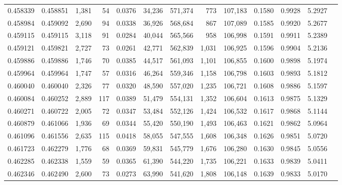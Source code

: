 \begin{tabular}{rrrrrrrrrrrrr}
0.458339 & 0.458851 & 1,381 &    54 &                                     0.0376 &  34,236 & 571,374 &     773 & 107,183 & 0.1580 & 0.9928 & 5.2927 \\
0.458984 & 0.459092 & 2,690 &    94 &                                     0.0338 &  36,926 & 568,684 &     867 & 107,089 & 0.1585 & 0.9920 & 5.2677 \\
0.459115 & 0.459115 & 3,118 &    91 &                                     0.0284 &  40,044 & 565,566 &     958 & 106,998 & 0.1591 & 0.9911 & 5.2389 \\
0.459121 & 0.459821 & 2,727 &    73 &                                     0.0261 &  42,771 & 562,839 &   1,031 & 106,925 & 0.1596 & 0.9904 & 5.2136 \\
0.459886 & 0.459886 & 1,746 &    70 &                                     0.0385 &  44,517 & 561,093 &   1,101 & 106,855 & 0.1600 & 0.9898 & 5.1974 \\
0.459964 & 0.459964 & 1,747 &    57 &                                     0.0316 &  46,264 & 559,346 &   1,158 & 106,798 & 0.1603 & 0.9893 & 5.1812 \\
0.460040 & 0.460040 & 2,326 &    77 &                                     0.0320 &  48,590 & 557,020 &   1,235 & 106,721 & 0.1608 & 0.9886 & 5.1597 \\
0.460084 & 0.460252 & 2,889 &   117 &                                     0.0389 &  51,479 & 554,131 &   1,352 & 106,604 & 0.1613 & 0.9875 & 5.1329 \\
0.460271 & 0.460722 & 2,005 &    72 &                                     0.0347 &  53,484 & 552,126 &   1,424 & 106,532 & 0.1617 & 0.9868 & 5.1144 \\
0.460879 & 0.461066 & 1,936 &    69 &                                     0.0344 &  55,420 & 550,190 &   1,493 & 106,463 & 0.1621 & 0.9862 & 5.0964 \\
0.461096 & 0.461556 & 2,635 &   115 &                                     0.0418 &  58,055 & 547,555 &   1,608 & 106,348 & 0.1626 & 0.9851 & 5.0720 \\
0.461723 & 0.462279 & 1,776 &    68 &                                     0.0369 &  59,831 & 545,779 &   1,676 & 106,280 & 0.1630 & 0.9845 & 5.0556 \\
0.462285 & 0.462338 & 1,559 &    59 &                                     0.0365 &  61,390 & 544,220 &   1,735 & 106,221 & 0.1633 & 0.9839 & 5.0411 \\
0.462346 & 0.462490 & 2,600 &    73 &                                     0.0273 &  63,990 & 541,620 &   1,808 & 106,148 & 0.1639 & 0.9833 & 5.0170 \\

\end{tabular}
